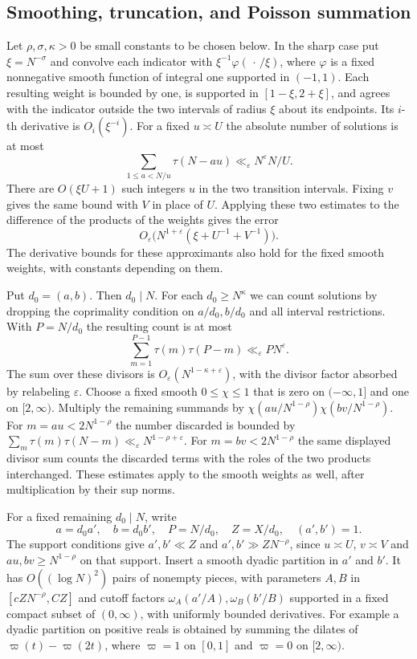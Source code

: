 \documentclass[11pt]{amsart}
\numberwithin{equation}{section}
\theoremstyle{remark}
\begin{document}
\subsection{Smoothing, truncation, and Poisson summation}

Let \(\rho,\sigma,\kappa>0\) be small constants to be chosen below.
In the sharp case put \(\xi=N^{-\sigma}\) and convolve each indicator
with \(\xi^{-1}\varphi(\,\cdot\,/\xi)\), where \(\varphi\) is a fixed
nonnegative smooth function of integral one supported in \((-1,1)\).
Each resulting weight is bounded by one, is supported in
\([1-\xi,2+\xi]\), and agrees with the indicator outside the two
intervals of radius \(\xi\) about its endpoints. Its \(i\)-th
derivative is \(O_i(\xi^{-i})\). For a fixed \(u\asymp U\) the absolute
number of solutions is at most
\[
 \sum_{1\le a<N/u}\tau(N-au)\ll_\varepsilon N^\varepsilon N/U.
\]
There are \(O(\xi U+1)\) such integers \(u\) in the two transition
intervals. Fixing \(v\) gives the same bound with \(V\) in place of
\(U\). Applying these two estimates to the difference of the products
of the weights gives the error
\begin{equation}\label{eq:rectangle-smoothing}
 O_\varepsilon\bigl(N^{1+\varepsilon}(\xi+U^{-1}+V^{-1})\bigr).
\end{equation}
The derivative bounds for these approximants also hold for the fixed
smooth weights, with constants depending on them.

Put \(d_0=(a,b)\). Then \(d_0\mid N\). For each \(d_0\ge N^\kappa\)
we can count solutions by dropping the coprimality condition on
\(a/d_0,b/d_0\) and all interval restrictions. With \(P=N/d_0\) the
resulting count is at most
\[
 \sum_{m=1}^{P-1}\tau(m)\tau(P-m)\ll_\varepsilon P N^\varepsilon.
\]
The sum over these divisors is
\(O_\varepsilon(N^{1-\kappa+\varepsilon})\), with the divisor factor
absorbed by relabeling \(\varepsilon\). Choose a fixed smooth
\(0\le\chi\le1\) that is zero on \((-\infty,1]\) and one on
\([2,\infty)\). Multiply the remaining summands by
\(\chi(au/N^{1-\rho})\chi(bv/N^{1-\rho})\). For
\(m=au<2N^{1-\rho}\) the number discarded is bounded by
\(\sum_m \tau(m)\tau(N-m)\ll_\varepsilon N^{1-\rho+\varepsilon}\).
For \(m=bv<2N^{1-\rho}\) the same displayed divisor sum counts the
discarded terms with the roles of the two products interchanged.
These estimates apply to the smooth weights as well, after
multiplication by their sup norms.

For a fixed remaining \(d_0\mid N\), write
\[
 a=d_0 a',\quad b=d_0b',\quad P=N/d_0,\quad Z=X/d_0,\quad
 (a',b')=1.
\]
The support conditions give \(a',b'\ll Z\) and
\(a',b'\gg ZN^{-\rho}\), since \(u\asymp U\), \(v\asymp V\) and
\(au,bv\ge N^{1-\rho}\) on that support. Insert a smooth dyadic
partition in \(a'\) and \(b'\). It has \(O((\log N)^2)\) pairs of
nonempty pieces, with parameters \(A,B\) in
\([cZN^{-\rho},C Z]\) and cutoff factors
\(\omega_A(a'/A),\omega_B(b'/B)\) supported in a fixed compact
subset of \((0,\infty)\), with uniformly bounded derivatives.
For example a dyadic partition on positive reals is obtained by
summing the dilates of \(\varpi(t)-\varpi(2t)\), where \(\varpi=1\)
on \([0,1]\) and \(\varpi=0\) on \([2,\infty)\).
\end{document}
